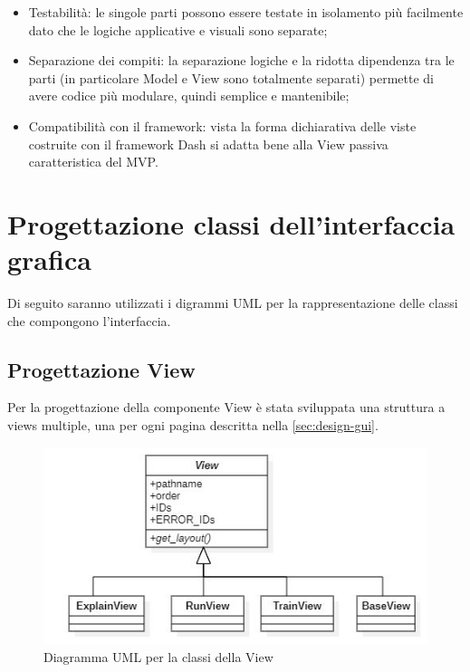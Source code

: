 \begin{itemize}

\item Testabilità: le singole parti possono essere testate in isolamento più facilmente dato che le logiche applicative e visuali sono separate;

\item Separazione dei compiti: la separazione logiche e la ridotta dipendenza tra le parti (in particolare Model e View sono totalmente separati) permette di avere codice più modulare, quindi semplice e mantenibile;

\item Compatibilità con il framework: vista la forma dichiarativa delle viste costruite con il framework Dash si adatta bene alla View passiva caratteristica del MVP.

\end{itemize}

\section{Progettazione classi dell'interfaccia grafica}
Di seguito saranno utilizzati i digrammi \gls{UML} per la rappresentazione delle classi che compongono l'interfaccia.

\subsection{Progettazione View}
\label{subsec:prog-views}
Per la progettazione della componente View è stata sviluppata una struttura a views multiple, una per ogni pagina descritta nella \autoref{sec:design-gui}.

\begin{figure}[H] 
    \centering 
    \includegraphics[width=0.8\columnwidth]{immagini/uml-views.jpg} 
    \caption{Diagramma UML per la classi della View}
    \label{fig:uml-views}
\end{figure}

